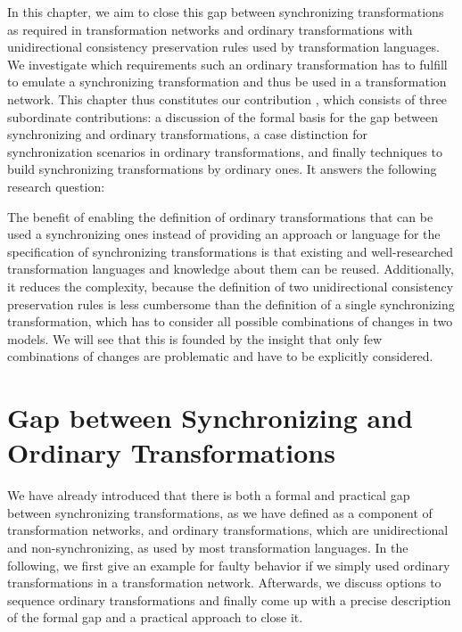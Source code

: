 In this chapter, we aim to close this gap between synchronizing transformations as required in transformation networks and ordinary transformations with unidirectional consistency preservation rules used by transformation languages.
We investigate which requirements such an ordinary transformation has to fulfill to emulate a synchronizing transformation and thus be used in a transformation network.
This chapter thus constitutes our contribution , which consists of three subordinate contributions: a discussion of the formal basis for the gap between synchronizing and ordinary transformations, a case distinction for synchronization scenarios in ordinary transformations, and finally techniques to build synchronizing transformations by ordinary ones.
It answers the following research question:


The benefit of enabling the definition of ordinary transformations that can be used a synchronizing ones instead of providing an approach or language for the specification of synchronizing transformations is that existing and well-researched transformation languages and knowledge about them can be reused.
Additionally, it reduces the complexity, because the definition of two unidirectional consistency preservation rules is less cumbersome than the definition of a single synchronizing transformation, which has to consider all possible combinations of changes in two models.
We will see that this is founded by the insight that only few combinations of changes are problematic and have to be explicitly considered.



\section{Gap between Synchronizing and Ordinary Transformations}

We have already introduced that there is both a formal and practical gap between synchronizing transformations, as we have defined as a component of transformation networks, and ordinary transformations, which are unidirectional and non-synchronizing, as used by most transformation languages.
In the following, we first give an example for faulty behavior if we simply used ordinary transformations in a transformation network.
Afterwards, we discuss options to sequence ordinary transformations and finally come up with a precise description of the formal gap and a practical approach to close it.

